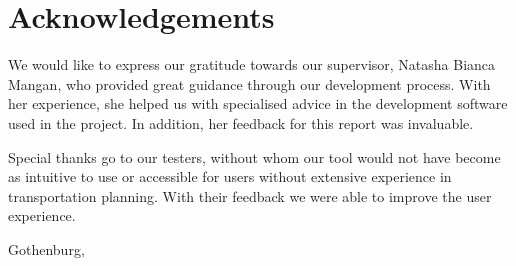 \thispagestyle{plain}
\section*{Acknowledgements}
    We would like to express our gratitude towards our supervisor, Natasha Bianca Mangan, who provided great guidance through our development process. With her experience, she helped us with specialised advice in the development software used in the project. In addition, her feedback for this report was invaluable.

    Special thanks go to our testers, without whom our tool would not have become as intuitive to use or accessible for users without extensive experience in transportation planning. With their feedback we were able to improve the user experience.

\vspace{1.5cm}
\hfill
\membertildelist{} Gothenburg, \monthname \space \the\year

\newpage
